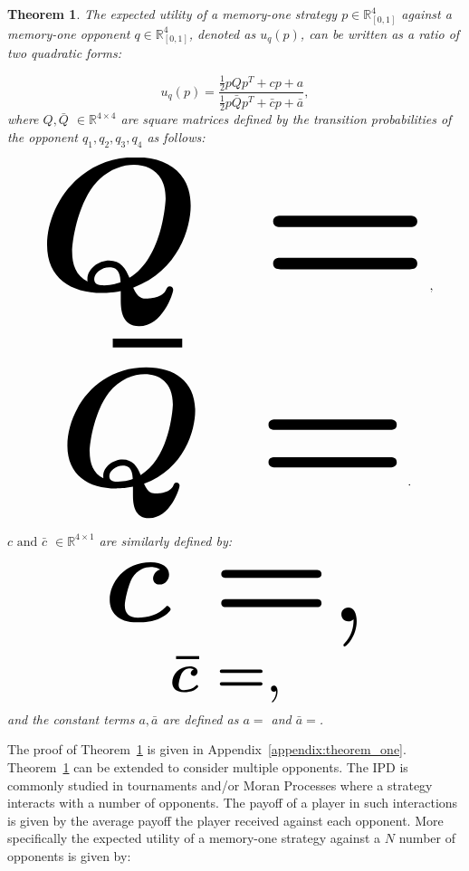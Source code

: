 \documentclass[10pt]{article}
\newcommand{\R}{\mathbb{R}}
\newtheorem{theorem}{Theorem}
\begin{document}
\begin{theorem}\label{theorem_one}
    The expected utility of a memory-one strategy \(p\in\mathbb{R}_{[0,1]}^4\)
    against a memory-one opponent \(q\in\mathbb{R}_{[0,1]}^4\), denoted
    as \(u_q(p)\), can be written as a ratio of two quadratic forms:

    \begin{equation}\label{eq:optimisation_quadratic}
    u_q(p) = \frac{\frac{1}{2}pQp^T + cp + a}
                {\frac{1}{2}p\bar{Q}p^T + \bar{c}p + \bar{a}},
    \end{equation}
    where \(Q, \bar{Q}\) \(\in \R^{4\times4}\) are square matrices defined by the
    transition probabilities of the opponent \(q_1, q_2, q_3, q_4\) as follows:

    \begin{center}
    \begin{equation}
    \resizebox{0.9\linewidth}{!}{\arraycolsep=2.5pt%
    \boldmath\(
    Q = \)},
    \end{equation}
    \begin{equation}\label{eq:q_bar_matrix}
    \resizebox{0.8\linewidth}{!}{\arraycolsep=2.5pt%
    \boldmath\(
    \bar{Q} =  \)}.
    \end{equation}
    \end{center}

    \(c \text{ and } \bar{c}\) \(\in \R^{4 \times 1}\) are similarly defined by:

    \begin{equation}\label{eq:q_matrix_numerator}
    \resizebox{0.6\linewidth}{!}{\arraycolsep=2.5pt%
    \boldmath\(c = \),}
    \end{equation}
    \begin{equation}\label{eq:q_matrix_denominator}
    \resizebox{0.3\linewidth}{!}{\arraycolsep=2.5pt%
    \boldmath\(\bar{c} = \),
    }
    \end{equation}
    and the constant terms \(a, \bar{a}\) are defined as \(a = \) and
    \(\bar{a} = \).
\end{theorem}

The proof of Theorem~\ref{theorem_one} is given in
Appendix~\ref{appendix:theorem_one}.
Theorem~\ref{theorem_one} can be extended to consider multiple
opponents. The IPD is commonly studied in tournaments and/or Moran Processes
where a strategy interacts with a number of opponents. The payoff of a player in
such interactions is given by the average payoff the player received against
each opponent. More specifically the expected utility of a memory-one strategy
against a \(N\) number of opponents is given by:
\end{document}
